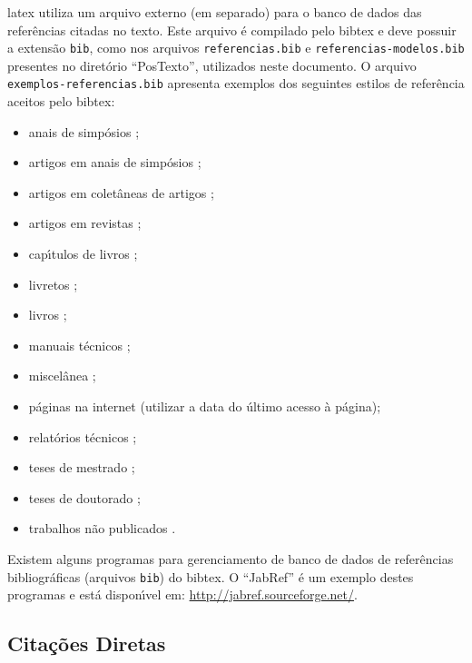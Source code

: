 \gls{latex} utiliza um arquivo externo (em separado) para o banco de dados das refer\^encias citadas no texto. Este arquivo \'e compilado pelo \gls{bibtex} e deve possuir a extens\~ao \texttt{bib}, como nos arquivos \texttt{referencias.bib} e \texttt{referencias-modelos.bib} presentes no diret\'orio ``PosTexto'', utilizados neste documento. O arquivo \texttt{exemplos-referencias.bib} apresenta exemplos dos seguintes estilos de refer\^encia aceitos pelo \gls{bibtex}:

\begin{itemize}%
\item anais de simp\'osios \citep{Alt1995,Pirmez2002};
\item artigos em anais de simp\'osios \citep{Faina2001};
\item artigos em colet\^aneas de artigos \citep{Pinto2000};
\item artigos em revistas \citep{Guimaraes2003};
\item cap\'{\i}tulos de livros \citep{Santos2000};
\item livretos \citep{Thompson2001};
\item livros \citep{Pedrycz1998};
\item manuais t\'ecnicos \citep{IONA1999};
\item miscel\^anea \citep{Cruz2003};
\item p\'aginas na internet \cite[acessado em 1 de janeiro de 2004]{Larsson2003} (utilizar a data do \'ultimo acesso \`a p\'agina);
\item relat\'orios t\'ecnicos \citep{OMG2000};
\item teses de mestrado \citep{SantosFilho2003};
\item teses de doutorado \citep{Faina2000};
\item trabalhos n\~ao publicados \citep{Sichman2002}.
\end{itemize}

Existem alguns programas para gerenciamento de banco de dados de refer\^encias bibliogr\'aficas (arquivos \texttt{bib}) do \gls{bibtex}. O ``JabRef'' \'e um exemplo destes programas e est\'a dispon\'{\i}vel em: \url{http://jabref.sourceforge.net/}.

\subsection{Cita\c{c}\~oes Diretas}\label{sec:citacoesdiretas}

